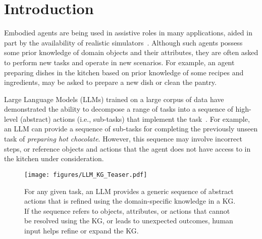 \section{Introduction}
\label{sec:introduction}
Embodied agents are being used in assistive roles in many applications, aided in part by the availability of realistic simulators~\cite{coppeliaSim,Puig_2018_CVPR,kolve2022ai2thorinteractive3denvironment}. Although such agents possess some prior knowledge of domain objects and their attributes, they are often asked to perform new tasks and operate in new scenarios. For example, an agent preparing dishes in the kitchen based on prior knowledge of some recipes and ingredients, may be asked to prepare a new dish or clean the pantry.


\vspace{-0.75em}
Large Language Models (LLMs) trained on a large corpus of data have demonstrated the ability to decompose a range of tasks into a sequence of high-level (abstract) actions (i.e., sub-tasks) that implement the task~\cite{khot2023decomposedpromptingmodularapproach,reppert2023iterateddecompositionimprovingscience,liu2024deltadecomposedefficientlongterm}. For example, an LLM can provide a sequence of sub-tasks for completing the previously unseen task of \textit{preparing hot chocolate}. However, this sequence may involve incorrect steps, or reference objects and actions that the agent does not have access to in the kitchen under consideration.

\begin{figure}[tb]
\centering
\captionsetup{font=scriptsize}
\setlength{\belowcaptionskip}{-10pt}
\texttt{[image: figures/LLM\_KG\_Teaser.pdf]}
\vspace{-0.5em}
\caption{For any given task, an LLM provides a generic sequence of abstract actions that is refined using the domain-specific knowledge in a KG. If the sequence refers to objects, attributes, or actions that cannot be resolved using the KG, or leads to unexpected outcomes, human input helps refine or expand the KG.}
\vspace{-6pt}
\label{fig:teaser}
\end{figure}

